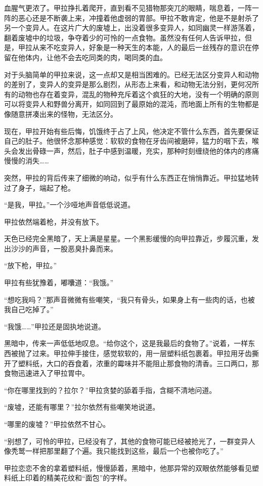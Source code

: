 血腥气更浓了。甲拉挣扎着爬开，直到看不见猎物那突兀的眼睛，喘息着，一阵一阵的恶心还是不断袭上来，冲撞着他虚弱的胃部。甲拉不敢肯定，他是不是射杀了另一个变异人。在这片广大的废墟上，出没着很多变异人，如同幽灵一样游荡着，翻着废墟中的垃圾，争夺着少的可怜的一点食物。虽然没有任何人告诉甲拉，但是，甲拉从来不吃变异人，好象是一种天生的本能，人的最后一丝残存的意识在停留在他体内，让他不会去吃同类的肉，喝同类的血。

对于头脑简单的甲拉来说，这一点却又是相当困难的。已经无法区分变异人和动物的差别了，变异人的变异是那么剧烈，从形态上来看，和动物无法分别，更何况所有的动物也存在着变异，混乱的物种充斥着这个疯狂的大地，没有一个明确的原则可以将变异人和野兽分离开，如同回到了最原始的混沌，而地面上所有的生物都是像随意拼凑出来的怪物，无法区分。

现在，甲拉开始有些后悔，饥饿终于占了上风，他决定不管什么东西，首先要保证自己的肚子。他很怀念那种感觉：软软的食物在牙齿间被磨碎，猛力的咽下去，喉头会发出骨碌一声，然后，肚子中感到温暖，充实，那种时刻缠绕他的体内的疼痛慢慢的消失……

突然，甲拉的背后传来了细微的响动，似乎有什么东西正在悄悄靠近。甲拉猛地转过了身子，端起了枪。

“是我，甲拉。”一个沙哑地声音低低说道。

甲拉依然端着枪，并没有放下。

天色已经完全黑暗了，天上满是星星。一个黑影缓慢的向甲拉靠近，步履沉重，发出沙沙的声音，一股恶臭扑鼻而来。

“放下枪，甲拉。”

甲拉有些犹豫着，嘟囔道：“我饿。”

“想吃我吗？”那声音微微有些嘲笑，“我只有骨头，如果身上有一些肉的话，也被我自己吃掉了。”

“我饿……”甲拉还是固执地说道。

黑暗中，传来一声低低地叹息。“给你这个，这是我最后的食物了。”说着，一样东西被抛了过来。甲拉伸手接住，感觉软软的，用一层塑料纸包裹着。甲拉用牙齿撕开了塑料纸，大口的吞食着，浓重的霉味并不能阻止那食物的清香。三口两口，那食物迅速进入了甲拉胃中。

“你在哪里找到的？拉尔？”甲拉贪婪的舔着手指，含糊不清地问道。

“废墟，还能有哪里？”拉尔依然有些嘲笑地说道。

“哪里的废墟？”甲拉依然不甘心。

“别想了，可怜的甲拉，已经没有了，其他的食物可能已经被抢光了，一群变异人像秃鹫一样把那里翻了个遍。我只能找到这些，最后一个也被你吃了。”

甲拉恋恋不舍的拿着塑料纸，慢慢舔着，黑暗中，他那异常的双眼依然能够看见塑料纸上印着的精美花纹和“面包”的字样。

